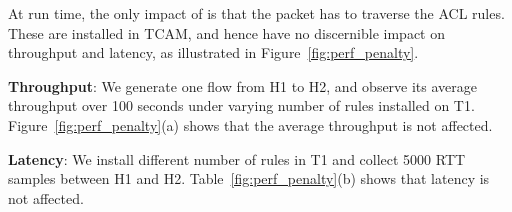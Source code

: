 At run time, the only impact of \sysname{} is that the packet has to traverse
the ACL rules. These are installed in TCAM, and hence have no discernible impact
on throughput and latency, as illustrated in Figure~\ref{fig:perf_penalty}.

\textbf{Throughput}: We generate one flow from H1 to H2, and observe its average
throughput over 100 seconds under varying number of \sysname{} rules installed
on T1. Figure~\ref{fig:perf_penalty}(a) shows that the average throughput is not
affected.

\textbf{Latency}: We install different number of \sysname{} rules in T1 and
collect 5000 RTT samples between H1 and H2.  Table~\ref{fig:perf_penalty}(b)
shows that latency is not affected.



%	
%		
%		
%	
%	
%
